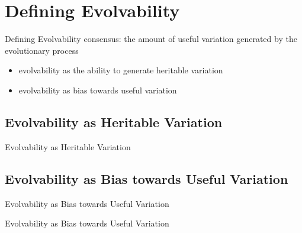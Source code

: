 \section{Defining Evolvability}

\begin{frame}{Defining Evolvability}
consensus: the amount of useful variation generated by the evolutionary process
\begin{itemize}
  \item evolvability as the ability to generate heritable variation
  \item evolvability as bias towards useful variation
\end{itemize}
\end{frame}


\subsection{Evolvability as Heritable Variation}

\begin{frame}{Evolvability as Heritable Variation}
	
\end{frame}

\subsection{Evolvability as Bias towards Useful Variation}

\begin{frame}{Evolvability as Bias towards Useful Variation}
  
\end{frame}

\begin{frame}{Evolvability as Bias towards Useful Variation}
  
\end{frame}
